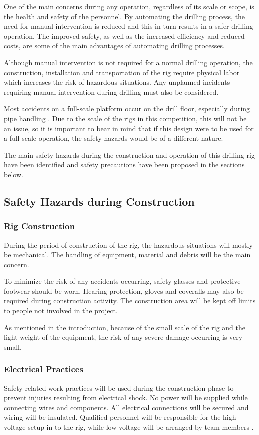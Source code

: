 One of the main concerns during any operation, regardless of its scale or scope, is the health and safety of the personnel. By automating the drilling process, the need for manual intervention is reduced and this in turn results in a safer 
drilling operation. The improved safety, as well as the increased efficiency and reduced costs, are some of the main advantages of automating drilling processes.

Although manual intervention is not required for a normal drilling operation, the construction, installation and transportation of the rig require physical labor which increases the risk of hazardous situations. Any unplanned 
incidents requiring manual intervention during drilling must also be considered.

Most accidents on a full-scale platform occur on the drill floor, especially during pipe handling \cite{drillcon}. Due to the scale of the rigs in this competition, this will not be an issue, so it is important to bear in mind that if this design were to be used for a full-scale operation, the safety hazards would be of a different nature.

The main safety hazards during the construction and operation of this drilling rig have been identified and safety 
precautions have been proposed in the sections below.

\subsection{Safety Hazards during Construction}
\subsubsection{Rig Construction}

During the period of construction of the rig, the hazardous situations will mostly be mechanical. The handling of equipment, material and debris will be the main concern.

To minimize the risk of any accidents occurring, safety glasses and protective footwear should be worn. Hearing protection, gloves and coveralls may also be required during construction activity. The construction area will be kept off limits to people not involved in the project.

As mentioned in the introduction, because of the small scale of the rig and the light weight of the equipment, the risk of any severe damage occurring is very small.


\subsubsection{Electrical Practices}
Safety related work practices will be used during the construction phase to prevent injuries resulting from electrical shock. No power will be supplied while connecting wires and components. All electrical connections will be secured and wiring will be insulated. Qualified personnel will be responsible for the high voltage setup in to the rig, while low voltage will be arranged by team members \cite{mtu}.

